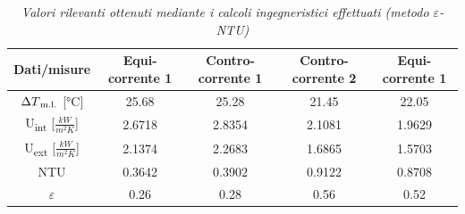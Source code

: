 \documentclass[a4paper,10pt]{article}                                                                                       %
\begin{document}
\begin{table}[H]                                                                                                            %
  \label{tab:eps_ntu_calcs}                                                                                                 %
  \centering                                                                                                                %
  \begin{tabular}{||c|c|c|c|c||}                                                                                            %
    \hline
    Dati/misure                                 & Equi-corrente 1 & Contro-corrente 1 & Contro-corrente 2 & Equi-corrente 1 \\
    \hline\hline
    $\Delta{T\textsubscript{m.l.}}$ [°C]        & 25.68           & 25.28             & 21.45             & 22.05           \\
    U\textsubscript{int} [$\frac{kW}{m^{2}K}$]  & 2.6718          & 2.8354            & 2.1081            & 1.9629          \\
    U\textsubscript{ext} [$\frac{kW}{m^{2}K}$]  & 2.1374          & 2.2683            & 1.6865            & 1.5703          \\
    NTU                                         & 0.3642          & 0.3902            & 0.9122            & 0.8708          \\
    $\varepsilon$                               & 0.26            & 0.28              & 0.56              & 0.52            \\
    \hline
  \end{tabular}                                                                                                             %
  \caption{\textit{Valori rilevanti ottenuti mediante i calcoli ingegneristici effettuati (metodo $\varepsilon$-NTU)}}      %
\end{table}                                                                                                                 %
\vspace{3mm}                                                                                                                %
\end{document}
